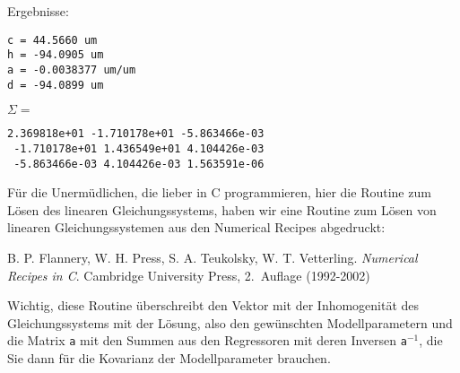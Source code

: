 Ergebnisse:
\begin{verbatim}
c = 44.5660 um
h = -94.0905 um
a = -0.0038377 um/um
d = -94.0899 um
\end{verbatim}

$\Sigma =$
\begin{verbatim}
2.369818e+01 -1.710178e+01 -5.863466e-03
 -1.710178e+01 1.436549e+01 4.104426e-03
 -5.863466e-03 4.104426e-03 1.563591e-06
\end{verbatim}

Für die Unermüdlichen, die lieber in C programmieren, hier die Routine zum Lösen
des linearen Gleichungssystems, haben wir eine Routine zum Lösen von linearen
Gleichungssystemen aus den Numerical Recipes abgedruckt:

B. P. Flannery, W. H. Press, S. A. Teukolsky, W. T. Vetterling. \textsl{Numerical Recipes
in C}. Cambridge University Press, 2.~Auflage (1992-2002)

Wichtig, diese Routine überschreibt den Vektor mit der Inhomogenität des Gleichungssystems
mit der Lösung, also den gewünschten Modellparametern und 
die Matrix \texttt{a} mit den Summen aus den Regressoren mit deren Inversen
\texttt{a}$^{-1}$, die Sie dann für die Kovarianz der Modellparameter brauchen.

